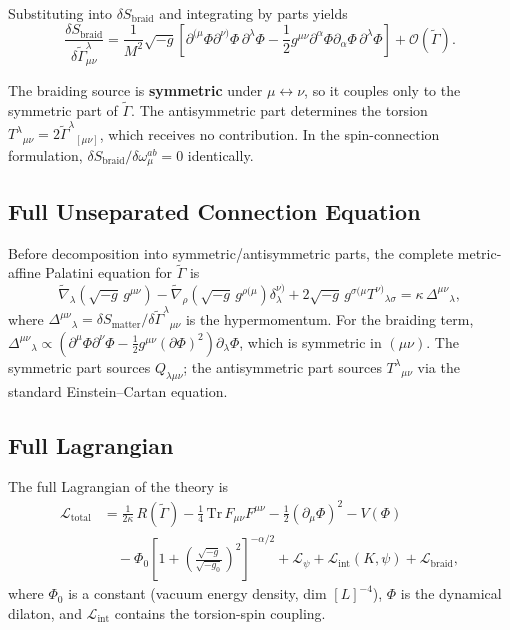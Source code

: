 \documentclass[twocolumn,prd,amsmath,amssymb]{revtex4-2}
\begin{document}
Substituting into $\delta S_{\text{braid}}$ and integrating by parts yields
\begin{equation}
\frac{\delta S_{\text{braid}}}{\delta\tilde{\Gamma}^\lambda_{\mu\nu}}
= \frac{1}{M^2}\sqrt{-g}\left[ \partial^{(\mu}\Phi\partial^{\nu)}\Phi\,\partial^\lambda\Phi
- \frac12 g^{\mu\nu}\partial^\alpha\Phi\partial_\alpha\Phi\,\partial^\lambda\Phi
\right] + \mathcal{O}(\tilde{\Gamma}).
\label{eq:braid-var}
\end{equation}

The braiding source is \textbf{symmetric} under $\mu\leftrightarrow\nu$, so it couples
only to the symmetric part of $\tilde{\Gamma}$.  The antisymmetric part determines the
torsion $T^\lambda{}_{\mu\nu}=2\tilde{\Gamma}^\lambda{}_{[\mu\nu]}$, which receives no
contribution.  In the spin-connection formulation,
$\delta S_{\text{braid}}/\delta\omega_\mu^{ab}=0$ identically.

\subsection{Full Unseparated Connection Equation}

Before decomposition into symmetric/antisymmetric parts, the complete metric-affine
Palatini equation for $\tilde{\Gamma}$ is
\begin{equation}
\tilde{\nabla}_\lambda(\sqrt{-g}\,g^{\mu\nu})
- \tilde{\nabla}_\rho(\sqrt{-g}\,g^{\rho(\mu})\delta^{\nu)}_\lambda
+ 2\sqrt{-g}\,g^{\sigma(\mu}T^{\nu)}{}_{\lambda\sigma} = \kappa\,\Delta^{\mu\nu}{}_\lambda,
\label{eq:full-palatini}
\end{equation}
where $\Delta^{\mu\nu}{}_\lambda = \delta S_{\text{matter}}/\delta\tilde{\Gamma}^\lambda{}_{\mu\nu}$
is the hypermomentum.  For the braiding term,
$\Delta^{\mu\nu}{}_\lambda \propto (\partial^\mu\Phi\partial^\nu\Phi
- \tfrac12 g^{\mu\nu}(\partial\Phi)^2)\partial_\lambda\Phi$, which is symmetric in $(\mu\nu)$.
The symmetric part sources $Q_{\lambda\mu\nu}$; the antisymmetric part sources
$T^\lambda{}_{\mu\nu}$ via the standard Einstein--Cartan equation.

\subsection{Full Lagrangian}

The full Lagrangian of the theory is
\begin{align}
\mathcal{L}_{\text{total}} &= \frac{1}{2\kappa}\,R(\tilde{\Gamma})
- \frac{1}{4}\,\mathrm{Tr}\,F_{\mu\nu}F^{\mu\nu}
- \frac{1}{2}(\partial_\mu\Phi)^2 - V(\Phi) \nonumber \\
&\quad - \Phi_0\left[1+\left(\frac{\sqrt{-g}}{\sqrt{-g_0}}\right)^{2}\right]^{-\alpha/2}
+ \mathcal{L}_\psi + \mathcal{L}_{\text{int}}(K,\psi) + \mathcal{L}_{\text{braid}},
\label{eq:total-lag}
\end{align}
where $\Phi_0$ is a constant (vacuum energy density, dim $[L]^{-4}$), $\Phi$ is the
dynamical dilaton, and $\mathcal{L}_{\text{int}}$ contains the torsion-spin coupling.
\end{document}
